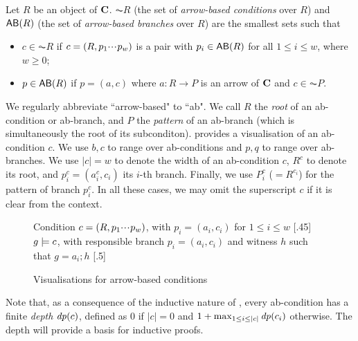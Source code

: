 \begin{definition}
  Let $R$ be an object of $\mathbf{C}$. $\AC R$ (the set of \emph{arrow-based conditions} over $R$) and $\AB R$ (the set of \emph{arrow-based branches} over $R$) are the smallest sets such that
  \begin{itemize}
  \item $c\in \AC R$ if $c=(R,p_1{\cdotp\mkern-2mu\cdotp\mkern-2mu\cdotp\mkern1mu} p_w)$ is a pair with $p_i\in \AB R$ for all $1\leq i\leq w$, where $w \geq 0$;
  \item $p\in \AB R$ if $p=(a,c)$ where $a: R\to P$ is an arrow of $\mathbf{C}$ and $c\in \AC P$.
  \end{itemize}
\end{definition}
%
We regularly abbreviate ``arrow-based" to ``ab". We call $R$ the \emph{root} of an ab-condition or ab-branch, and $P$ the \emph{pattern} of an ab-branch (which is simultaneously the root of its subconditon).  provides a visualisation of an ab-condition $c$. We use $b,c$ to range over ab-conditions and $p,q$ to range over ab-branches. We use $|c|=w$ to denote the width of an ab-condition $c$, $R^c$ to denote its root, and $p^c_i=(a^c_i,c_i)$ its $i$-th branch. Finally, we use $P^c_i$ ($=R^{c_i}$) for the pattern of branch $p^c_i$. In all these cases, we may omit the superscript $c$ if it is clear from the context.
%
\begin{figure}[t]
\centering
\subcaptionbox
  {Condition $c=(R,p_1{\cdotp\mkern-2mu\cdotp\mkern-2mu\cdotp\mkern1mu} p_w)$, with $p_i=(a_i,c_i)$ for $1\leq i\leq w$
   }
  [.45\textwidth]
  {}
\quad
\subcaptionbox
  {$g\models c$, with responsible branch $p_i=(a_i,c_i)$ and witness $h$ such that $g=a_i;h$
   }
  [.5\textwidth]
  {}
\caption{Visualisations for arrow-based conditions}
\end{figure}

Note that, as a consequence of the inductive nature of , every ab-condition has a finite \emph{depth} $\mathit{dp}(c)$, defined as $0$ if $|c|=0$ and $1+\max_{1\leq i\leq |c|} \mathit{dp}(c_i)$ otherwise. The depth will provide a basis for inductive proofs.

